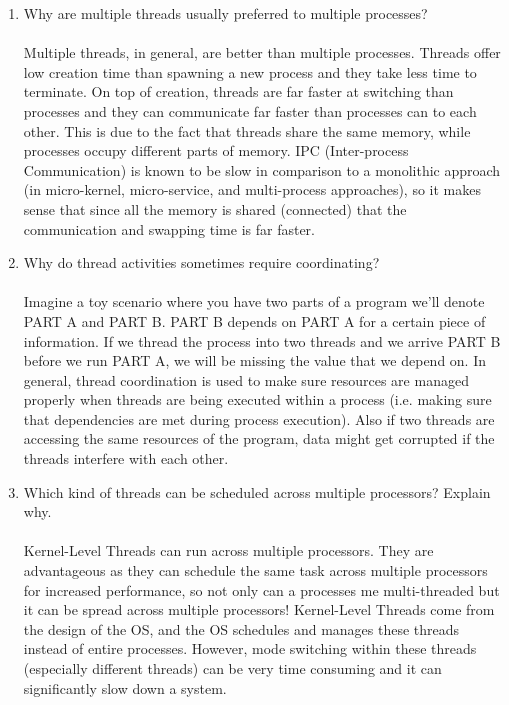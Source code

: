 \documentclass[12pt]{article}
\begin{document}
\begin{enumerate}
	\item  Why are multiple threads usually preferred to multiple processes? \\ \\
	Multiple threads, in general, are better than multiple processes. Threads offer low creation time than spawning a new process and they take less time to terminate. On top of creation, threads are far faster at switching than processes and they can communicate far faster than processes can to each other. This is due to the fact that threads share the same memory, while processes occupy different parts of memory. IPC (Inter-process Communication) is known to be slow in comparison to a monolithic approach (in micro-kernel, micro-service, and multi-process approaches), so it makes sense that since all the memory is shared (connected) that the communication and swapping time is far faster. \\
   
   \item Why do thread activities sometimes require coordinating? \\ \\
	Imagine a toy scenario where you have two parts of a program we'll denote PART A and PART B. PART B depends on PART A for a certain piece of information. If we thread the process into two threads and we arrive PART B before we run PART A, we will be missing the value that we depend on. In general, thread coordination is used to make sure resources are managed properly when threads are being executed within a process (i.e. making sure that dependencies are met during process execution). Also if two threads are accessing the same resources of the program, data might get corrupted if the threads interfere with each other. \\
	\pagebreak
	\item Which kind of threads can be scheduled across multiple processors?  Explain why. \\ \\
	Kernel-Level Threads can run across multiple processors. They are advantageous as they can schedule the same task across multiple processors for increased performance, so not only can a processes me multi-threaded but it can be spread across multiple processors! Kernel-Level Threads come from the design of the OS, and the OS schedules and manages these threads instead of entire processes. However, mode switching within these threads (especially different threads) can be very time consuming and it can significantly slow down a system.
   
\end{enumerate}
	
\end{document}
